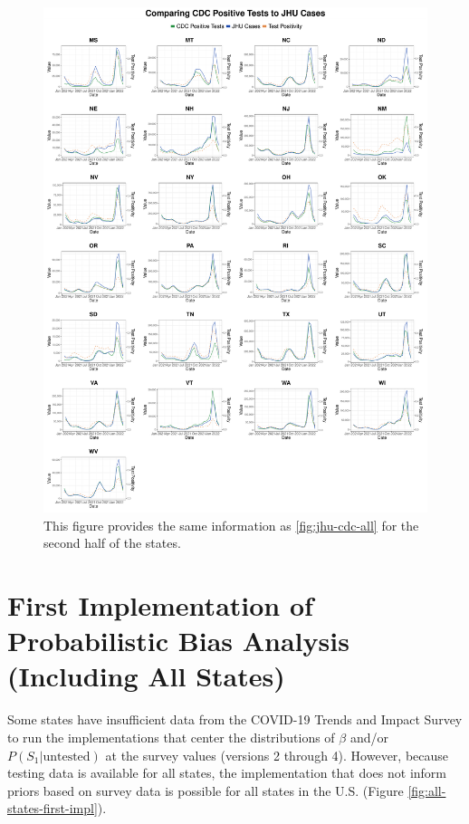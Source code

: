 \documentclass[12pt,twoside]{smiththesis}
\begin{document}
\begin{figure}

{\centering \includegraphics[width=1\linewidth]{figure/jhu_cdc_all_states_2} 

}

\caption{\label{fig:jhu-cdc-all2} This figure provides the same information as \ref{fig:jhu-cdc-all} for the second half of the states.}\label{fig:unnamed-chunk-111}
\end{figure}
\hypertarget{first-implementation-of-probabilistic-bias-analysis-including-all-states}{%
\section{First Implementation of Probabilistic Bias Analysis (Including All States)}\label{first-implementation-of-probabilistic-bias-analysis-including-all-states}}

Some states have insufficient data from the COVID-19 Trends and Impact Survey to run the implementations that center the distributions of \(\beta\) and/or \(P(S_1|\text{untested})\) at the survey values (versions 2 through 4). However, because testing data is available for all states, the implementation that does not inform priors based on survey data is possible for all states in the U.S. (Figure \ref{fig:all-states-first-impl}).
\end{document}
